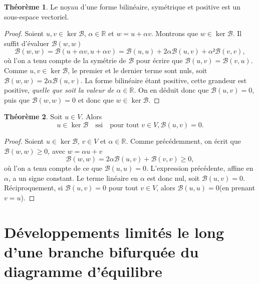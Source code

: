 \documentclass[12pt, final]{amsart}
\theoremstyle{definition}
\newtheorem{theorem}{Théorème}
\newcommand{\reals}{\mathbb{R}}
\begin{document}
\begin{theorem}
  Le noyau d'une forme bilinéaire, symétrique et positive est un sous-espace
  vectoriel.
\end{theorem}
\begin{proof}
  Soient \(u, v∈\ker \mathcal{B}\), \(α∈\reals\) et \(w = u + α v\). Montrons
  que \(w ∈ \ker\mathcal{B}\). Il suffit d'évaluer \(\mathcal{B}(w, w)\)
 \begin{equation}
   \mathcal{B}(w, w) = \mathcal{B}(u + α v, u + α v)
   = \mathcal{B}(u, u) + 2 α \mathcal{B}(u, v) + α² \mathcal{B}(v, v),
 \end{equation}
 où l'on a tenu compte de la symétrie de \(\mathcal{B}\) pour écrire que
 \(\mathcal{B}(u, v) =\mathcal{B}(v, u)\). Comme \(u, v ∈ \ker\mathcal{B}\), le
 premier et le dernier terme sont nuls, soit
 \(\mathcal{B}(w, w) = 2α \mathcal{B}(u, v)\). La forme bilinéaire étant
 positive, cette grandeur est positive, \emph{quelle que soit la valeur de
   \(α∈\reals\)}. On en déduit donc que \(\mathcal{B}(u, v) = 0\), puis que
 \(\mathcal{B}(w, w) = 0\) et donc que \(w ∈ \ker\mathcal{B}\).
\end{proof}

\begin{theorem}
 Soit \(u∈V\). Alors
 \begin{equation}
  u ∈ \ker\mathcal{B} \quad \text{ssi} \quad \text{pour tout } v ∈ V, \mathcal{B}(u, v) = 0.
 \end{equation}
\end{theorem}

\begin{proof}
  Soient \(u∈\ker \mathcal{B}\), \(v∈V\) et \(α∈\reals\). Comme précédemment, on
  écrit que \(\mathcal{B}(w, w) ≥ 0\), avec \(w = α u + v\)
 \begin{equation}
  \mathcal{B}(w, w) = 2 α \mathcal{B}(u, v) +\mathcal{B}(v, v) \geq
  0,
 \end{equation}
 où l'on a tenu compte de ce que \(\mathcal{B}(u, u) = 0\). L'expression
 précédente, affine en \(α\), a un signe constant. Le terme linéaire en \(α\)
 est donc nul, soit \(\mathcal{B}(u, v) = 0\).  Réciproquement, si
 \(\mathcal{B}(u, v) = 0\) pour tout \(v∈V\), alors \(\mathcal{B}(u, u) = 0\)(en
 prenant \(v = u\)).
\end{proof}

\section{Développements limités le long d'une branche bifurquée du diagramme d'équilibre}
\end{document}
